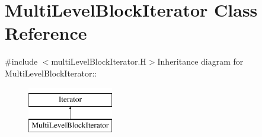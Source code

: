 \hypertarget{classMultiLevelBlockIterator}{
\section{MultiLevelBlockIterator Class Reference}
\label{classMultiLevelBlockIterator}
}


{\ttfamily \#include $<$multiLevelBlockIterator.H$>$}Inheritance diagram for MultiLevelBlockIterator::\begin{figure}[H]
\begin{center}
\leavevmode
\includegraphics[height=2cm]{classMultiLevelBlockIterator}
\end{center}
\end{figure}
